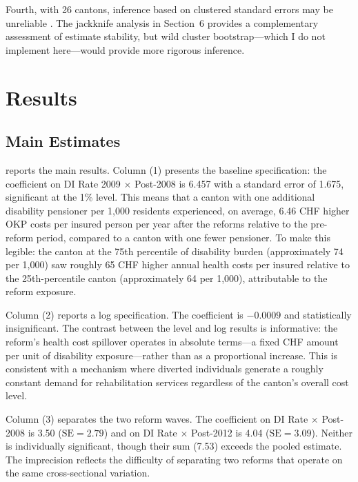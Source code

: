 \documentclass[12pt]{article}
\begin{document}
Fourth, with 26 cantons, inference based on clustered standard errors may be unreliable \citep{cameron2015practitioner}. The jackknife analysis in Section~6 provides a complementary assessment of estimate stability, but wild cluster bootstrap---which I do not implement here---would provide more rigorous inference.


\section{Results}

\subsection{Main Estimates}



 reports the main results. Column (1) presents the baseline specification: the coefficient on DI Rate 2009 $\times$ Post-2008 is 6.457 with a standard error of 1.675, significant at the 1\% level. This means that a canton with one additional disability pensioner per 1,000 residents experienced, on average, 6.46 CHF higher OKP costs per insured person per year after the reforms relative to the pre-reform period, compared to a canton with one fewer pensioner. To make this legible: the canton at the 75th percentile of disability burden (approximately 74 per 1,000) saw roughly 65 CHF higher annual health costs per insured relative to the 25th-percentile canton (approximately 64 per 1,000), attributable to the reform exposure.

Column (2) reports a log specification. The coefficient is $-0.0009$ and statistically insignificant. The contrast between the level and log results is informative: the reform's health cost spillover operates in absolute terms---a fixed CHF amount per unit of disability exposure---rather than as a proportional increase. This is consistent with a mechanism where diverted individuals generate a roughly constant demand for rehabilitation services regardless of the canton's overall cost level.

Column (3) separates the two reform waves. The coefficient on DI Rate $\times$ Post-2008 is 3.50 ($\text{SE} = 2.79$) and on DI Rate $\times$ Post-2012 is 4.04 ($\text{SE} = 3.09$). Neither is individually significant, though their sum (7.53) exceeds the pooled estimate. The imprecision reflects the difficulty of separating two reforms that operate on the same cross-sectional variation.
\end{document}
